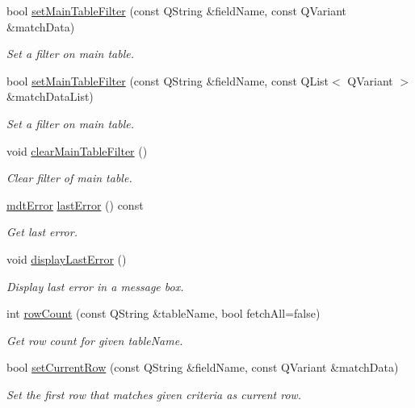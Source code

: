 \begin{DoxyCompactItemize}
bool \hyperlink{classmdt_sql_form_abfc6d7f49debf02f5016923cbd422f2f}{set\-Main\-Table\-Filter} (const Q\-String \&field\-Name, const Q\-Variant \&match\-Data)
\begin{DoxyCompactList}\small\item\em Set a filter on main table. \end{DoxyCompactList}\item 
bool \hyperlink{classmdt_sql_form_a61c0a1a4a2c53ca5571168e9761adff8}{set\-Main\-Table\-Filter} (const Q\-String \&field\-Name, const Q\-List$<$ Q\-Variant $>$ \&match\-Data\-List)
\begin{DoxyCompactList}\small\item\em Set a filter on main table. \end{DoxyCompactList}\item 
void \hyperlink{classmdt_sql_form_a37cd63844276e50bda58fe8edafc704e}{clear\-Main\-Table\-Filter} ()
\begin{DoxyCompactList}\small\item\em Clear filter of main table. \end{DoxyCompactList}\item 
\hyperlink{classmdt_error}{mdt\-Error} \hyperlink{classmdt_sql_form_a04724293298421c404e93c58015cda5e}{last\-Error} () const 
\begin{DoxyCompactList}\small\item\em Get last error. \end{DoxyCompactList}\item 
void \hyperlink{classmdt_sql_form_a7521d231f24663ee1d2acb904387353b}{display\-Last\-Error} ()
\begin{DoxyCompactList}\small\item\em Display last error in a message box. \end{DoxyCompactList}\item 
int \hyperlink{classmdt_sql_form_a533d58efc54f9ecc180467cd13b8e511}{row\-Count} (const Q\-String \&table\-Name, bool fetch\-All=false)
\begin{DoxyCompactList}\small\item\em Get row count for given table\-Name. \end{DoxyCompactList}\item 
bool \hyperlink{classmdt_sql_form_a268cedc485a92877a551cee34cf0eecc}{set\-Current\-Row} (const Q\-String \&field\-Name, const Q\-Variant \&match\-Data)
\begin{DoxyCompactList}\small\item\em Set the first row that matches given criteria as current row. \end{DoxyCompactList}\item 

\end{DoxyCompactItemize}
